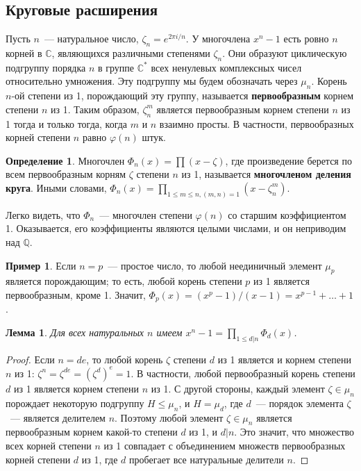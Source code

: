 \documentclass[a4paper,11pt]{scrartcl}
\theoremstyle{plain}
\newtheorem{lemma}[theorem]{Лемма}
\theoremstyle{definition}
\newtheorem{definition}[theorem]{Определение}
\newtheorem{example}[theorem]{Пример}
\newcommand\dfn[1]{\textbf{#1}}
\newcommand\mb{\mathbb}
\newcommand\ph{\varphi}
\begin{document}
\subsection{Круговые расширения}

Пусть $n$~--- натуральное число, $\zeta_n=e^{2\pi i/n}$. У многочлена
$x^n-1$ есть ровно $n$ корней в $\mb C$, являющихся различными
степенями $\zeta_n$. Они образуют циклическую подгруппу порядка $n$ в
группе $\mb C^*$ всех ненулевых комплексных чисел относительно
умножения. Эту подгруппу мы будем обозначать через
$\mu_n$. Корень $n$-ой степени из 1, порождающий эту группу,
называется \dfn{первообразным} корнем степени $n$ из 1. Таким образом,
$\zeta_n^m$ является первообразным корнем степени $n$ из 1 тогда и
только тогда, когда $m$ и $n$ взаимно просты. В частности,
первообразных корней степени $n$ равно $\ph(n)$ штук.

\begin{definition}
Многочлен $\Phi_n(x)=\prod(x-\zeta)$, где произведение берется по всем
первообразным корням $\zeta$ степени $n$ из 1, называется
\dfn{многочленом деления круга}. Иными словами,
$\Phi_n(x)=\prod_{1\leq m\leq n, (m,n)=1}(x-\zeta_n^m)$.
\end{definition}

Легко видеть, что $\Phi_n$~--- многочлен степени $\ph(n)$ со старшим
коэффициентом 1. Оказывается, его коэффициенты являются целыми
числами, и он неприводим над $\mb Q$.

\begin{example}
Если $n=p$~--- простое число, то любой неединичный элемент $\mu_p$
является порождающим; то есть, любой корень степени $p$ из 1 является
первообразным, кроме 1. Значит,
$\Phi_p(x)=(x^p-1)/(x-1)=x^{p-1}+\dots+1$.
\end{example}

\begin{lemma}\label{cyclotomic_moebius}
Для всех натуральных $n$ имеем
$x^n-1=\prod_{1\leq d|n}\Phi_d(x)$.
\end{lemma}
\begin{proof}
Если $n=de$, то любой корень $\zeta$ степени $d$ из 1 является и
корнем степени $n$ из 1: $\zeta^n=\zeta^{de}=(\zeta^d)^e=1$. В
частности, любой первообразный корень степени $d$ из 1 является корнем
степени $n$ из 1. С другой стороны, каждый элемент $\zeta\in\mu_n$
порождает некоторую подгруппу $H\leq\mu_n$, и $H=\mu_d$, где $d$~---
порядок элемента $\zeta$~--- является делителем $n$. Поэтому любой
элемент $\zeta\in\mu_n$ является первообразным корнем какой-то степени
$d$ из 1, и $d|n$. Это значит, что множество всех корней степени $n$
из 1 совпадает с объединением множеств первообразных корней степени
$d$ из 1, где $d$ пробегает все натуральные делители $n$.
\end{proof}
\end{document}
